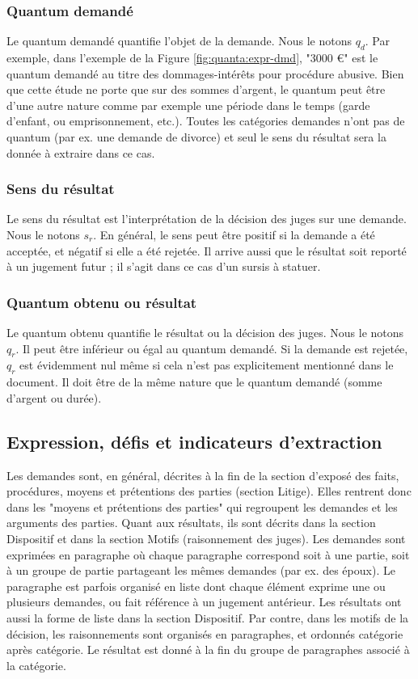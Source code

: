 \subsubsection{Quantum demandé}

Le quantum demandé quantifie l'objet de la demande. Nous le notons $q_d$. Par exemple, dans l'exemple de la Figure \ref{fig:quanta:expr-dmd}, "3000 \euro{}" est le quantum demandé au titre des dommages-intérêts pour procédure abusive. Bien que cette étude ne porte que sur des sommes d'argent, le quantum peut être d'une autre nature comme par exemple une période dans le temps (garde d'enfant, ou emprisonnement, etc.). Toutes les catégories demandes n'ont pas de quantum (par ex. une demande de divorce) et seul le sens du résultat sera la donnée à extraire dans ce cas.

\subsubsection{Sens du résultat}

Le sens du résultat est l'interprétation de la décision des juges sur une demande. Nous le notons $s_r$. En général, le sens peut être positif si la demande a été acceptée, et négatif si elle a été rejetée. Il arrive aussi que le résultat soit reporté à un jugement futur ; il s'agit dans ce cas d'un sursis à statuer. 

\subsubsection{Quantum obtenu ou résultat}

Le quantum obtenu quantifie le résultat ou la décision des juges. Nous le notons $q_r$. Il peut être inférieur ou égal au quantum demandé. Si la demande est rejetée, 
$q_r$ est évidemment nul même si cela n'est pas explicitement mentionné dans le document. Il doit être de la même nature que le quantum demandé (somme d'argent ou durée).


\subsection{Expression, défis et indicateurs d'extraction}

Les demandes sont, en général, décrites à la fin de la section d'exposé des faits, procédures, moyens et prétentions des parties (section Litige). Elles rentrent donc dans les "moyens et prétentions des parties" qui regroupent les demandes et les arguments des parties. Quant aux résultats, ils sont décrits dans la section Dispositif et dans la section Motifs (raisonnement des juges). Les demandes sont exprimées en paragraphe où chaque paragraphe correspond soit à une partie, soit à un groupe de partie partageant les mêmes demandes (par ex. des époux). Le paragraphe est parfois organisé en liste dont chaque élément exprime une ou plusieurs demandes, ou fait référence à un jugement antérieur. Les résultats ont aussi la forme de liste dans la section Dispositif. Par contre, dans les motifs de la décision, les raisonnements sont organisés en paragraphes, et ordonnés catégorie après catégorie. Le résultat est donné à la fin du groupe de paragraphes associé à la catégorie.


